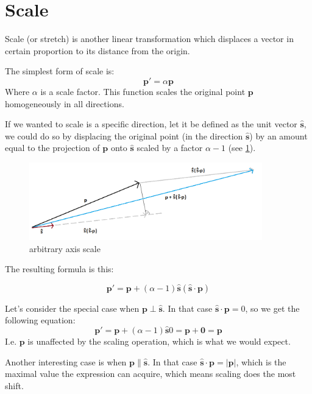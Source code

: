 \documentclass[]{report}   %
\begin{document}
\section{Scale}
Scale (or stretch) is another linear transformation which displaces a vector in certain proportion to its distance from the origin.

The simplest form of scale is:
\[ \mathbf{p\prime} = \alpha\mathbf{p} \]
Where \(\alpha\) is a scale factor. This function scales the original point \(\mathbf{p}\) homogeneously in all directions.



If we wanted to scale is a specific direction, let it be defined as the unit vector \(\mathbf{\hat{s}}\), we could do so by displacing the original point (in the direction \(\mathbf{\hat{s}}\)) by an amount equal to the projection of \(\mathbf{p}\) onto \(\mathbf{\hat{s}}\) scaled by a factor \(\alpha-1\) (see
\ref{fig:arb_axis_scale}).

\begin{figure}[htb]
\centering
\includegraphics[width=0.9\textwidth]{arbitrary-axis-scale-diagram}
\caption{arbitrary axis scale}
\label{fig:arb_axis_scale}
\end{figure}

The resulting formula is this:
\begin{mdframed}
\[
	\mathbf{p\prime} = 
	\mathbf{p} + (\alpha - 1) \mathbf{\hat{s}}(\mathbf{\hat{s}}\cdot \mathbf{p})
\]
\end{mdframed}

Let's consider the special case when \(\mathbf{p}\perp\mathbf{\hat{s}}\). In that case \(\mathbf{\hat{s}}\cdot \mathbf{p} = 0\), so we get the following equation:
\[
	\mathbf{p\prime} = 
	\mathbf{p} + (\alpha - 1) \mathbf{\hat{s}}0 = \mathbf{p} + \mathbf{0} = \mathbf{p}
\]
I.e. \(\mathbf{p}\) is unaffected by the scaling operation, which is what we would expect.

Another interesting case is when \(\mathbf{p}\parallel\mathbf{\hat{s}}\). In that case \(\mathbf{\hat{s}}\cdot \mathbf{p} = |\mathbf{p}|\), which is the maximal value the expression can acquire, which means scaling does the most shift.
\end{document}
